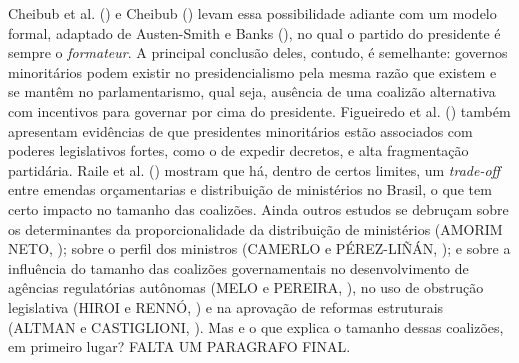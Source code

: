 Cheibub et al. (\citeyear{cheibub2004}) e Cheibub (\citeyear{cheibub2007}) levam essa possibilidade adiante com um modelo formal, adaptado de Austen-Smith e Banks (\citeyear{austen1988}), no qual o partido do presidente é sempre o \textit{formateur}. A principal conclusão deles, contudo, é semelhante: governos minoritários podem existir no presidencialismo pela mesma razão que existem e se mantêm no parlamentarismo, qual seja, ausência de uma coalizão alternativa com incentivos para governar por cima do presidente. Figueiredo et al. (\citeyear{figueiredo2012}) também apresentam evidências de que presidentes minoritários estão associados com poderes legislativos fortes, como o de expedir decretos, e alta fragmentação partidária. Raile et al. (\citeyear{raile2010}) mostram que há, dentro de certos limites, um \textit{trade-off} entre emendas orçamentarias e distribuição de ministérios no Brasil, o que tem certo impacto no tamanho das coalizões. Ainda outros estudos se debruçam sobre os determinantes da proporcionalidade da distribuição de ministérios (AMORIM NETO, \citeyear{neto2006}); sobre o perfil dos ministros (CAMERLO e PÉREZ-LIÑÁN, \citeyear{camerlo2012}); e sobre a influência do tamanho das coalizões governamentais no desenvolvimento de agências regulatórias autônomas (MELO e PEREIRA, \citeyear{melo2013}), no uso de obstrução legislativa (HIROI e RENNÓ, \citeyear{hiroi2014}) e na aprovação de reformas estruturais (ALTMAN e CASTIGLIONI, \citeyear{altman2008}). Mas e o que explica o tamanho dessas coalizões, em primeiro lugar? FALTA UM PARAGRAFO FINAL.
